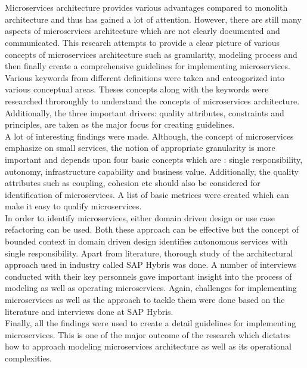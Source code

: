 \chapter{\abstractname}
Microservices architecture provides various advantages compared to monolith architecture and thus has gained a lot of attention. However, there are still many aspects of microservices architecture which are not clearly documented and communicated. This research attempts to provide a clear picture of various concepts of microservices architecture such as granularity, modeling process and then finally create a comprehensive guidelines for implementing microservices.\\
Various keywords from different definitions were taken and cateogorized into various conceptual areas. Theses concepts along with the keywords were researched throroughly to understand the concepts of microservices architecture. Additionally, the three important drivers: quality attributes, constraints and principles, are taken as the major focus for creating guidelines.\\
A lot of interesting findings were made. Although, the concept of microservices emphasize on small services, the notion of appropriate granularity is more important and depends upon four basic concepts which are : single responsibility, autonomy, infrastructure capability and business value. Additionally, the quality attributes such as coupling, cohesion etc should also be considered for identification of microservices. A list of basic metrices were created which can make it easy to qualify microservices.\\
In order to identify microservices, either domain driven design or use case refactoring can be used. Both these approach can be effective but the concept of bounded context in domain driven design identifies autonomous services with single responsibility. Apart from literature, thorough study of the architectural approach used in industry called SAP Hybris was done. A number of interviews conducted with their key personnels gave important insight into the process of modeling as well as operating microservices. Again, challenges for implementing microservices as well as the approach to tackle them were done based on the literature and interviews done at SAP Hybris.\\
Finally, all the findings were used to create a detail guidelines for implementing microservices. This is one of the major outcome of the research which dictates how to approach modeling microservices architecture as well as its operational complexities.